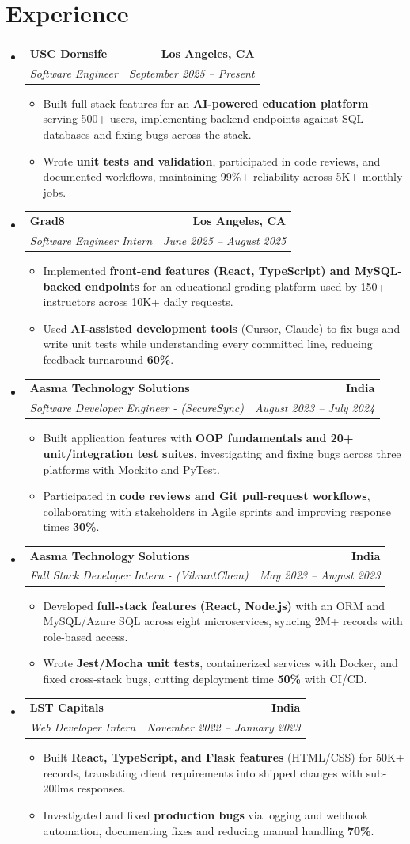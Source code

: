\documentclass[letterpaper,10pt]{article}
\makeatletter
\newcommand{\resumeItem}[1]{\item\small{{#1 \vspace{-2pt}}}}
\newcommand{\resumeSubheading}[4]{\vspace{-1pt}\item\begin{tabular*}{1.0\textwidth}[t]{l@{\extracolsep{\fill}}r}\textbf{#1} & \textbf{\small #2} \\\textit{\small#3} & \textit{\small #4} \\\end{tabular*}\vspace{-2pt}}
\newcommand{\resumeSubHeadingListStart}{\begin{itemize}[leftmargin=0.0in, label={}]}
\newcommand{\resumeSubHeadingListEnd}{\end{itemize}}
\newcommand{\resumeItemListStart}{\begin{itemize}[leftmargin=0.15in,label=\textbullet,itemsep=2pt,topsep=0pt,parsep=0pt,partopsep=0pt]}
\newcommand{\resumeItemListEnd}{\end{itemize}\vspace{-4pt}}
\makeatother
\begin{document}
\section{Experience}
\resumeSubHeadingListStart
\resumeSubheading{USC Dornsife}{Los Angeles, CA}{Software Engineer}{September 2025 -- Present}
\resumeItemListStart
\resumeItem{Built full-stack features for an \textbf{AI-powered education platform} serving 500+ users, implementing backend endpoints against SQL databases and fixing bugs across the stack.}
\resumeItem{Wrote \textbf{unit tests and validation}, participated in code reviews, and documented workflows, maintaining 99\%+ reliability across 5K+ monthly jobs.}
\resumeItemListEnd
\resumeSubheading{Grad8}{Los Angeles, CA}{Software Engineer Intern}{June 2025 -- August 2025}
\resumeItemListStart
\resumeItem{Implemented \textbf{front-end features (React, TypeScript) and MySQL-backed endpoints} for an educational grading platform used by 150+ instructors across 10K+ daily requests.}
\resumeItem{Used \textbf{AI-assisted development tools} (Cursor, Claude) to fix bugs and write unit tests while understanding every committed line, reducing feedback turnaround \textbf{60\%}.}
\resumeItemListEnd
\resumeSubheading{Aasma Technology Solutions}{India}{Software Developer Engineer - (SecureSync)}{August 2023 -- July 2024}
\resumeItemListStart
\resumeItem{Built application features with \textbf{OOP fundamentals and 20+ unit/integration test suites}, investigating and fixing bugs across three platforms with Mockito and PyTest.}
\resumeItem{Participated in \textbf{code reviews and Git pull-request workflows}, collaborating with stakeholders in Agile sprints and improving response times \textbf{30\%}.}
\resumeItemListEnd
\resumeSubheading{Aasma Technology Solutions}{India}{Full Stack Developer Intern - (VibrantChem)}{May 2023 -- August 2023}
\resumeItemListStart
\resumeItem{Developed \textbf{full-stack features (React, Node.js)} with an ORM and MySQL/Azure SQL across eight microservices, syncing 2M+ records with role-based access.}
\resumeItem{Wrote \textbf{Jest/Mocha unit tests}, containerized services with Docker, and fixed cross-stack bugs, cutting deployment time \textbf{50\%} with CI/CD.}
\resumeItemListEnd
\resumeSubheading{LST Capitals}{India}{Web Developer Intern}{November 2022 -- January 2023}
\resumeItemListStart
\resumeItem{Built \textbf{React, TypeScript, and Flask features} (HTML/CSS) for 50K+ records, translating client requirements into shipped changes with sub-200ms responses.}
\resumeItem{Investigated and fixed \textbf{production bugs} via logging and webhook automation, documenting fixes and reducing manual handling \textbf{70\%}.}
\resumeItemListEnd
\resumeSubHeadingListEnd
\vspace{-6pt}
\end{document}
